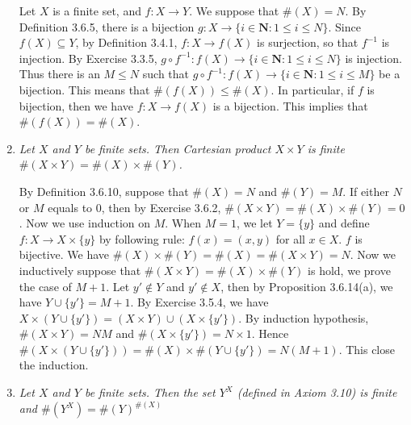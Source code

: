 \documentclass{book}
\newcounter{Exercise}[section]
\renewcommand{\theExercise}{\thesection.\arabic{Exercise}.}
\begin{document}
\begin{enumerate}
    Let $X$ is a finite set, and $f:X\to Y$. We suppose that $\#(X)=N$. By Definition 3.6.5, there is a bijection $g:X\to\{i\in\mathbf{N}:1\leq i\leq N\}$. Since $f(X)\subseteq Y$, by Definition 3.4.1, $f:X\to f(X)$ is surjection, so that $f^{-1}$ is injection. By Exercise 3.3.5, $g\circ f^{-1}:f(X)\to\{i\in\mathbf{N}:1\leq i\leq N\}$ is injection. Thus there is an $M\leq N$ such that $g\circ f^{-1}:f(X)\to\{i\in\mathbf{N}:1\leq i\leq M\}$ be a bijection. This means that $\#(f(X))\leq\#(X)$. In particular, if $f$ is bijection, then we have $f:X\to f(X)$ is a bijection. This implies that $\#(f(X))=\#(X)$.
    \begin{comment}
    Suppose that $f$ is bijective, then we have $f:X\to f(X)$ is a bijection. This implies that $\#(f(X))=\#(X)$. Otherwise, we have $f(X)\subseteq Y$, then we can find a subset $X'$ of $X$ such that $g:X'\to f(X)$ be a bijective function. By Proposition 3.6.14(c), we have $\#(f(X))\leq\#(X)$.
    \end{comment}
    \item \emph{Let $X$ and $Y$ be finite sets. Then Cartesian product $X\times Y$ is finite $\#(X\times Y)=\#(X)\times \#(Y)$.}

    By Definition 3.6.10, suppose that $\#(X)=N$ and $\#(Y)=M$. If either $N$ or $M$ equals to $0$, then by Exercise 3.6.2, $\#(X\times Y)=\#(X)\times \#(Y)=0$. Now we use induction on $M$. When $M=1$, we let $Y=\{y\}$ and define $f:X\to X\times\{y\}$ by following rule: $f(x)=(x,y)$ for all $x\in X$. $f$ is bijective. We have $\#(X)\times\#(Y)=\#(X)=\#(X\times Y)=N$. Now we inductively suppose that $\#(X\times Y)=\#(X)\times \#(Y)$ is hold, we prove the case of $M+1$. Let $y'\notin Y$ and $y'\notin X$, then by Proposition 3.6.14(a), we have $Y\cup\{y'\}=M+1$. By Exercise 3.5.4, we have $X\times(Y\cup\{y'\})=(X\times Y)\cup(X\times\{y'\})$. By induction hypothesis, $\#(X\times Y)=NM$ and $\#(X\times\{y'\})=N\times 1$. Hence $\#(X\times(Y\cup\{y'\}))=\#(X)\times\#(Y\cup\{y'\})=N(M+1)$. This close the induction.

    \item \pdfbookmark[2]{Revision \theExercise}{3.6.4}\emph{Let $X$ and $Y$ be finite sets. Then the set $Y^X$ (defined in Axiom 3.10) is finite and $\#(Y^X)=\#(Y)^{\#(X)}$}


\end{enumerate}
\end{document}
